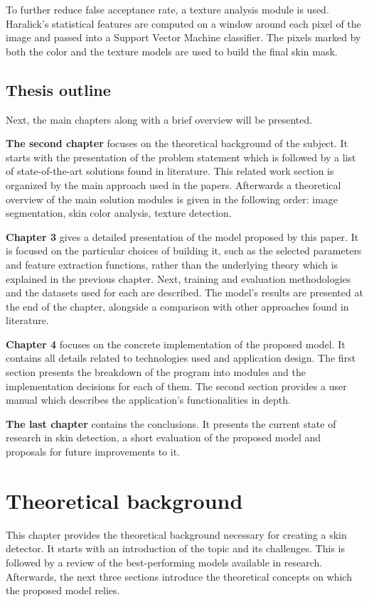 \documentclass[12pt]{report}
\begin{document}
	To further reduce false acceptance rate, a texture analysis module is used. Haralick's statistical features are computed on a window around each pixel of the image and passed into a Support Vector Machine classifier. The pixels marked by both the color and the texture models are used to build the final skin mask.
	
	\section{Thesis outline}
	Next, the main chapters along with a brief overview will be presented.
	
	\textbf{The second chapter} focuses on the theoretical background of the subject. It starts with the presentation of the problem statement which is followed by a list of state-of-the-art solutions found in literature. This related work section is organized by the main approach used in the papers. Afterwards a theoretical overview of the main solution modules is given in the following order: image segmentation, skin color analysis, texture detection.
	
	\textbf{Chapter 3} gives a detailed presentation of the model proposed by this paper. It is focused on the particular choices of building it, such as the selected parameters and feature extraction functions, rather than the underlying theory which is explained in the previous chapter. Next, training and evaluation methodologies and the datasets used for each are described. The model's results are presented at the end of the chapter, alongside a comparison with other approaches found in literature.
	
	\textbf{Chapter 4} focuses on the concrete implementation of the proposed model. It contains all details related to technologies used and application design. The first section presents the breakdown of the program into modules and the implementation decisions for each of them. The second section provides a user manual which describes the application's functionalities in depth.
	
	\textbf{The last chapter} contains the conclusions. It presents the current state of research in skin detection, a short evaluation of the proposed model and proposals for future improvements to it.
	
	\chapter{Theoretical background}
	This chapter provides the theoretical background necessary for creating a skin detector. It starts with an introduction of the topic and its challenges. This is followed by a review of the best-performing models available in research. Afterwards, the next three sections introduce the theoretical concepts on which the proposed model relies.
	
\end{document}
